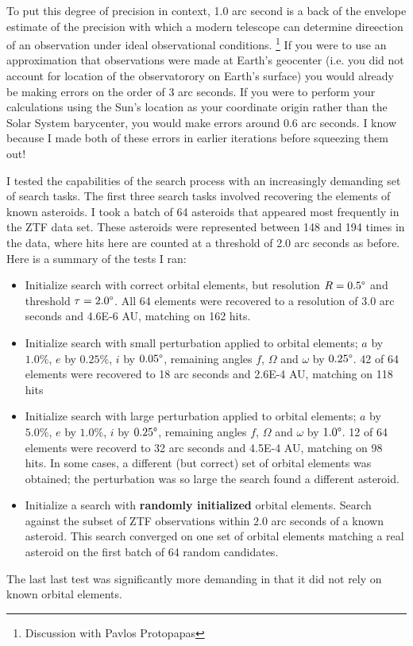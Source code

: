 To put this degree of precision in context, 1.0 arc second is a back of the envelope estimate of the 
precision with which a modern telescope can determine direection of an observation under ideal observational conditions.
\footnote{Discussion with Pavlos Protopapas}
If you were to use an approximation that observations were made at Earth's geocenter 
(i.e. you did not account for location of the observatorory on Earth's surface) 
you would already be making errors on the order of 3 arc seconds.
If you were to perform your calculations using the Sun's location as your coordinate origin rather than the Solar System barycenter,
you would make errors around 0.6 arc seconds.
I know because I made both of these errors in earlier iterations before squeezing them out!

I tested the capabilities of the search process with an increasingly demanding set of search tasks.
The first three search tasks involved recovering the elements of known asteroids.
I took a batch of 64 asteroids that appeared most frequently in the ZTF data set.
These asteroids were represented between 148 and 194 times in the data, 
where hits here are counted at a threshold of 2.0 arc seconds as before.
Here is a summary of the tests I ran:
\begin{itemize}
\item Initialize search with correct orbital elements, but resolution $R = 0.5 \degree$ and threshold $\tau = 2.0 \degree$.
All 64 elements were recovered to a resolution of 3.0 arc seconds and 4.6E-6 AU, matching on 162 hits.
\item Initialize search with small perturbation applied to orbital elements; $a$ by $1.0\%$, $e$ by $0.25\%$, $i$ by $0.05 \degree$,
remaining angles $f$, $\Omega$ and $\omega$ by $0.25 \degree$.
42 of 64 elements were recovered to 18 arc seconds and 2.6E-4 AU, matching on 118 hits
\item Initialize search with large perturbation applied to orbital elements; $a$ by $5.0\%$, $e$ by $1.0\%$, $i$ by $0.25 \degree$,
remaining angles $f$, $\Omega$ and $\omega$ by $1.0 \degree$.
12 of 64 elements were recoverd to 32 arc seconds and 4.5E-4 AU, matching on 98 hits.
In some cases, a different (but correct) set of orbital elements was obtained;
the perturbation was so large the search found a different asteroid.
\item Initialize a search with \textbf{randomly initialized} orbital elements.
Search against the subset of ZTF observations within $2.0$ arc seconds of a known asteroid.
This search converged on one set of orbital elements matching a real asteroid on the first batch of 64 random candidates.
\end{itemize}
The last last test was significantly more demanding in that it did not rely on known orbital elements.

